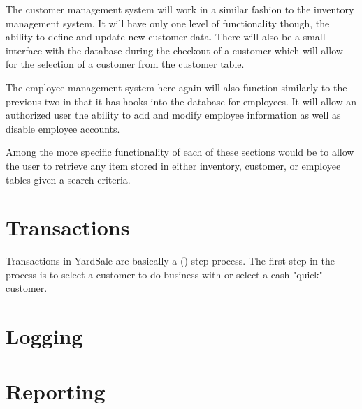 \documentclass[a4paper,10pt]{article}
\begin{document}
The customer management system will work in a similar fashion to the inventory management system. It will have only one level of functionality though, the ability to define and update new customer data. There will also be a small interface with the database during the checkout of a customer which will allow for the selection of a customer from the customer table.

The employee management system here again will also function similarly to the previous two in that it has hooks into the database for employees. It will allow an authorized user the ability to add and modify employee information as well as disable employee accounts.

Among the more specific functionality of each of these sections would be to allow the user to retrieve any item stored in either inventory, customer, or employee tables given a search criteria. 

\section{Transactions}

Transactions in YardSale are basically a () step process. The first step in the process is to select a customer to do business with or select a cash "quick" customer.

\section{Logging}

\section{Reporting}
\end{document}
